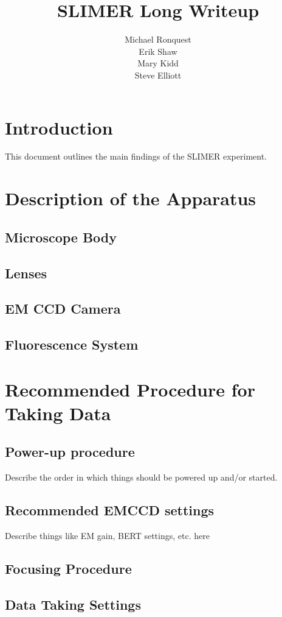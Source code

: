 \documentclass[11pt]{amsart}
\title{SLIMER Long Writeup}
\author{Michael Ronquest \\
Erik Shaw \\
Mary Kidd\\
Steve Elliott}
\begin{document}
\maketitle
\section{Introduction}
This document outlines the main findings of the SLIMER experiment. 
\section{Description of the Apparatus}
\subsection{Microscope Body}
\subsection{Lenses}
\subsection{EM CCD Camera}
\subsection{Fluorescence System}



\section{Recommended Procedure for Taking Data}
\subsection{Power-up procedure}
Describe the order in which things should be powered up and/or started.
\subsection{Recommended EMCCD settings}
Describe things like EM gain, BERT settings, etc. here
\subsection{Focusing Procedure}
\subsection{Data Taking Settings}
\end{document}
